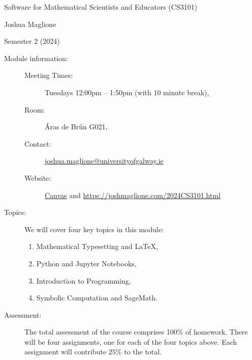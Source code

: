 \documentclass[a4paper, 12pt]{article}
\begin{document}
\pagestyle{empty}

\begin{center}
{\Large Software for Mathematical Scientists and Educators (CS3101)} 

\vspace{0.25cm}

{\large Joshua Maglione}

\vspace{0.25cm}

Semester 2 (2024)
\end{center}

\vspace{0.5cm}

\begin{description}
    \item[Module information:] \hfill
    \begin{description}
      \item[Meeting Times:] Tuesdays 12:00pm -- 1:50pm (with 10 minute break),
      \item[Room:] \'Aras de Br\'un G021,
      \item[Contact:] \url{joshua.maglione@universityofgalway.ie} 
      \item[Website:] \href{https://universityofgalway.instructure.com/}{\textsf{Canvas}} and \url{https://joshmaglione.com/2024CS3101.html} 
    \end{description} 
    \vspace{1cm}
    \item[Topics:] We will cover four key topics in this module:
    \begin{enumerate} 
      \item Mathematical Typesetting and \LaTeX,
      \item Python and Jupyter Notebooks,
      \item Introduction to Programming,
      \item Symbolic Computation and SageMath.
    \end{enumerate}
    
    \vspace{1cm}
    \item[Assessment:] The total assessment of the course comprises 100\% of
    homework. There will be four assignments, one for each of the four topics
    above. Each assignment will contribute $25\%$ to the total. 
\end{description}
\end{document}

